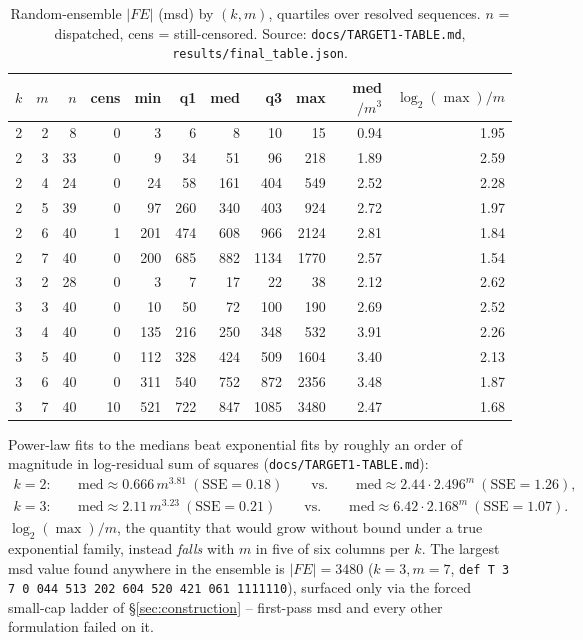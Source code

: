 \documentclass[11pt]{article}
\begin{document}
\begin{table}[h]
\centering
\caption{Random-ensemble $|FE|$ (msd) by $(k,m)$, quartiles over resolved sequences.
$n$ = dispatched, cens = still-censored. Source: \texttt{docs/TARGET1-TABLE.md},
\texttt{results/final\_table.json}.}
\label{tab:ensemble}
\begin{tabular}{@{}rrrrrrrrrrr@{}}
\toprule
$k$ & $m$ & $n$ & cens & min & q1 & med & q3 & max & med$/m^3$ & $\log_2(\max)/m$ \\
\midrule
2 & 2 & 8  & 0  & 3   & 6   & 8   & 10   & 15   & 0.94 & 1.95 \\
2 & 3 & 33 & 0  & 9   & 34  & 51  & 96   & 218  & 1.89 & 2.59 \\
2 & 4 & 24 & 0  & 24  & 58  & 161 & 404  & 549  & 2.52 & 2.28 \\
2 & 5 & 39 & 0  & 97  & 260 & 340 & 403  & 924  & 2.72 & 1.97 \\
2 & 6 & 40 & 1  & 201 & 474 & 608 & 966  & 2124 & 2.81 & 1.84 \\
2 & 7 & 40 & 0  & 200 & 685 & 882 & 1134 & 1770 & 2.57 & 1.54 \\
3 & 2 & 28 & 0  & 3   & 7   & 17  & 22   & 38   & 2.12 & 2.62 \\
3 & 3 & 40 & 0  & 10  & 50  & 72  & 100  & 190  & 2.69 & 2.52 \\
3 & 4 & 40 & 0  & 135 & 216 & 250 & 348  & 532  & 3.91 & 2.26 \\
3 & 5 & 40 & 0  & 112 & 328 & 424 & 509  & 1604 & 3.40 & 2.13 \\
3 & 6 & 40 & 0  & 311 & 540 & 752 & 872  & 2356 & 3.48 & 1.87 \\
3 & 7 & 40 & 10 & 521 & 722 & 847 & 1085 & 3480 & 2.47 & 1.68 \\
\bottomrule
\end{tabular}
\end{table}

Power-law fits to the medians beat exponential fits by roughly an order of magnitude in
log-residual sum of squares (\texttt{docs/TARGET1-TABLE.md}):
\begin{align*}
k=2:&\quad \mathrm{med} \approx 0.666\, m^{3.81}\ (\mathrm{SSE}=0.18) \qquad\text{vs.}\qquad
        \mathrm{med} \approx 2.44 \cdot 2.496^{m}\ (\mathrm{SSE}=1.26),\\
k=3:&\quad \mathrm{med} \approx 2.11\, m^{3.23}\ (\mathrm{SSE}=0.21) \qquad\text{vs.}\qquad
        \mathrm{med} \approx 6.42 \cdot 2.168^{m}\ (\mathrm{SSE}=1.07).
\end{align*}
$\log_2(\max)/m$, the quantity that would grow without bound under a true exponential
family, instead \emph{falls} with $m$ in five of six columns per $k$. The largest msd
value found anywhere in the ensemble is $|FE|=3480$ ($k=3,m=7$,
\texttt{def T 3 7 0 044 513 202 604 520 421 061 1111110}), surfaced only via the forced
small-cap ladder of \S\ref{sec:construction} -- first-pass msd and every other
formulation failed on it.
\end{document}
